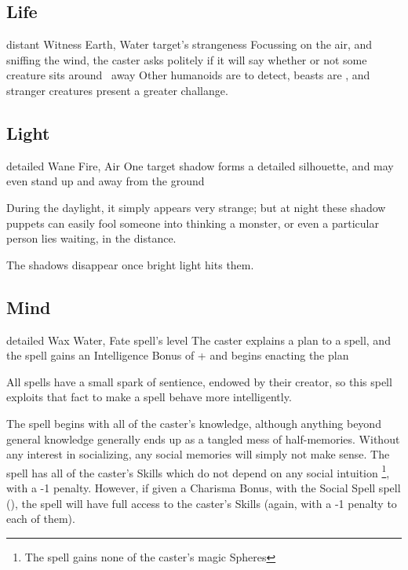 \begin{multicols}{2}
\subsection{Life}


  {distant}%
  {Witness}%
  {Earth, Water}%
  {target's strangeness}%
  {Focussing on the air, and sniffing the wind, the caster asks politely if it will say whether or not some creature sits around \spellRange\ away}%
  {Other humanoids are \tn[7] to detect, beasts are \tn[9], and stranger creatures present a greater challange.}

\subsection{Light}


  {detailed}%
  {Wane}%
  {Fire, Air}%
  {}%
  {One target shadow forms a detailed silhouette, and may even stand up and away from the ground}%
  {During the daylight, it simply appears very strange; but at night these shadow puppets can easily fool someone into thinking a monster, or even a particular person lies waiting, in the distance.

  The shadows disappear once bright light hits them.}

\subsection{Mind}


  {detailed}%
  {Wax}%
  {Water, Fate}%
  {spell's level}%
  {The caster explains a plan to a spell, and the spell gains an Intelligence Bonus of + and begins enacting the plan}%
  {
  All spells have a small spark of sentience, endowed by their creator, so this spell exploits that fact to make a spell behave more intelligently.

  The spell begins with all of the caster's knowledge, although anything beyond general knowledge generally ends up as a tangled mess of half-memories.
  Without any interest in socializing, any social memories will simply not make sense.
  The spell has all of the caster's Skills which do not depend on any social intuition%
  \footnote{The spell gains none of the caster's magic Spheres},
  with a -1 penalty.
  However, if given a Charisma Bonus, with the Social Spell spell (), the spell will have full access to the caster's Skills (again, with a -1 penalty to each of them).

}
\end{multicols}
